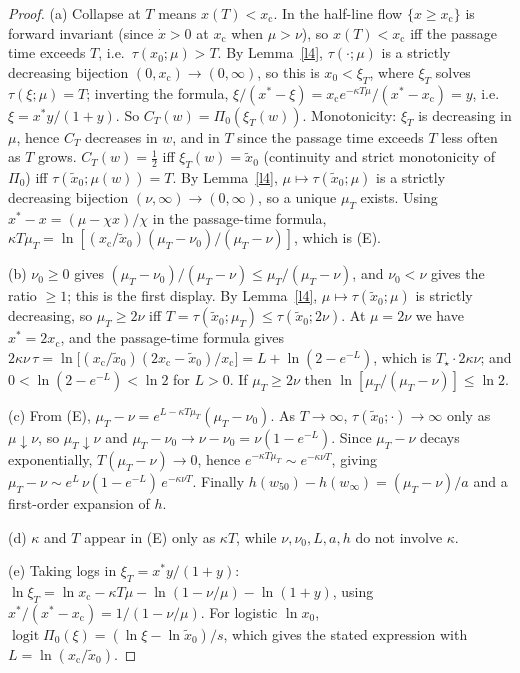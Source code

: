 \documentclass[11pt]{article}
\theoremstyle{definition}
\theoremstyle{remark}
\newcommand{\wfifty}{w_{50}}
\newcommand{\xc}{x_{\mathrm c}}
\newcommand{\xmed}{\tilde x_0}
\newcommand{\Tstar}{T_\star}
\newcommand{\logit}{\operatorname{logit}}
\begin{document}
\begin{proof}
(a) Collapse at $T$ means $x(T)<\xc$. In the half-line flow $\{x\ge\xc\}$ is forward invariant (since $\dot x>0$ at $\xc$ when $\mu>\nu$), so $x(T)<\xc$ iff the passage time exceeds $T$, i.e.\ $\tau(x_0;\mu)>T$. By Lemma~\ref{l4}, $\tau(\cdot;\mu)$ is a strictly decreasing bijection $(0,\xc)\to(0,\infty)$, so this is $x_0<\xi_T$, where $\xi_T$ solves $\tau(\xi;\mu)=T$; inverting the formula, $\xi/(x^*-\xi)=\xc e^{-\kappa T\mu}/(x^*-\xc)=y$, i.e.\ $\xi=x^*y/(1+y)$. So $C_T(w)=\Pi_0(\xi_T(w))$. Monotonicity: $\xi_T$ is decreasing in $\mu$, hence $C_T$ decreases in $w$, and in $T$ since the passage time exceeds $T$ less often as $T$ grows. $C_T(w)=\tfrac12$ iff $\xi_T(w)=\xmed$ (continuity and strict monotonicity of $\Pi_0$) iff $\tau(\xmed;\mu(w))=T$. By Lemma~\ref{l4}, $\mu\mapsto\tau(\xmed;\mu)$ is a strictly decreasing bijection $(\nu,\infty)\to(0,\infty)$, so a unique $\mu_T$ exists. Using $x^*-x=(\mu-\chi x)/\chi$ in the passage-time formula, $\kappa T\mu_T=\ln[(\xc/\xmed)(\mu_T-\nu_0)/(\mu_T-\nu)]$, which is (E).

(b) $\nu_0\ge0$ gives $(\mu_T-\nu_0)/(\mu_T-\nu)\le\mu_T/(\mu_T-\nu)$, and $\nu_0<\nu$ gives the ratio $\ge1$; this is the first display. By Lemma~\ref{l4}, $\mu\mapsto\tau(\xmed;\mu)$ is strictly decreasing, so $\mu_T\ge2\nu$ iff $T=\tau(\xmed;\mu_T)\le\tau(\xmed;2\nu)$. At $\mu=2\nu$ we have $x^*=2\xc$, and the passage-time formula gives $2\kappa\nu\,\tau=\ln\!\big[(\xc/\xmed)(2\xc-\xmed)/\xc\big]=L+\ln(2-e^{-L})$, which is $\Tstar\cdot2\kappa\nu$; and $0<\ln(2-e^{-L})<\ln2$ for $L>0$. If $\mu_T\ge2\nu$ then $\ln[\mu_T/(\mu_T-\nu)]\le\ln2$.

(c) From (E), $\mu_T-\nu=e^{L-\kappa T\mu_T}(\mu_T-\nu_0)$. As $T\to\infty$, $\tau(\xmed;\cdot)\to\infty$ only as $\mu\downarrow\nu$, so $\mu_T\downarrow\nu$ and $\mu_T-\nu_0\to\nu-\nu_0=\nu(1-e^{-L})$. Since $\mu_T-\nu$ decays exponentially, $T(\mu_T-\nu)\to0$, hence $e^{-\kappa T\mu_T}\sim e^{-\kappa\nu T}$, giving $\mu_T-\nu\sim e^L\,\nu(1-e^{-L})\,e^{-\kappa\nu T}$. Finally $h(\wfifty)-h(w_\infty)=(\mu_T-\nu)/a$ and a first-order expansion of $h$.

(d) $\kappa$ and $T$ appear in (E) only as $\kappa T$, while $\nu,\nu_0,L,a,h$ do not involve $\kappa$.

(e) Taking logs in $\xi_T=x^*y/(1+y)$: $\ln\xi_T=\ln\xc-\kappa T\mu-\ln(1-\nu/\mu)-\ln(1+y)$, using $x^*/(x^*-\xc)=1/(1-\nu/\mu)$. For logistic $\ln x_0$, $\logit\Pi_0(\xi)=(\ln\xi-\ln\xmed)/s$, which gives the stated expression with $L=\ln(\xc/\xmed)$.
\end{proof}
\end{document}
